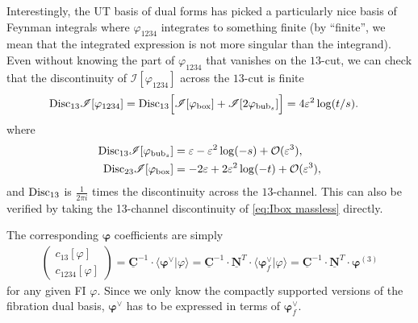 \documentclass[11pt]{article}
\newcommand{\la}{\langle}
\newcommand{\ra}{\rangle}
\newcommand{\vphi}{\varphi}
\newcommand{\vep}{\varepsilon}
\newcommand{\disc}{{\rm Disc}}
\newcommand{\bs}[1]{\boldsymbol{#1}}
\newcommand{\mat}[1]{\underline{\boldsymbol{#1}}}
\begin{document}
Interestingly, the UT basis of dual forms has picked a particularly nice basis of Feynman integrals where $\vphi_{1234}$ integrates to something finite
(by ``finite'', we mean that the integrated expression is not more singular than the integrand).
Even without knowing the part of $\vphi_{1234}$ that vanishes on the $13$-cut, we can check that the discontinuity of $\mathscr{I}[\vphi_{1234}]$ across the $13$-cut is finite
\begin{align}
	\disc_{13}\mathscr{I}[\vphi_{1234}]
	& = \disc_{13} \Big[ 
		\mathscr{I}[\vphi_{\text{box}}] 
		+ \mathscr{I}[2\vphi_{\text{bub}_s}] 
	\Big]
	= 4\vep^2 \log(t/s).
\end{align}
where 
\begin{align}
	\disc_{13}\mathscr{I}[\vphi_{\text{bub}_s}]
	& = \vep - \vep^2 \log(-s) + \mathcal{O}(\vep^3),
	\\
	\disc_{23}\mathscr{I}[\vphi_{\text{box}}]
	& = -2\vep + 2\vep^2 \log(-t) + \mathcal{O}(\vep^3),
\end{align}
and $\disc_{13}$ is $\frac{1}{2\pi i}$ times the discontinuity across the $13$-channel.
This can also be verified by taking the 13-channel discontinuity of \eqref{eq:Ibox massless} directly. 



The corresponding $\bs{\vphi}$ coefficients are simply 
\begin{align}
	\begin{pmatrix} c_{13}[\vphi] \\ c_{1234}[\vphi] \end{pmatrix}
	= \mat{C}^{-1} \cdot \la \bs{\vphi}^\vee \vert \vphi \rangle
	= \mat{C}^{-1} \cdot \mat{N}^T \cdot \la \bs{\vphi}^\vee_f \vert \vphi \ra
	= \mat{C}^{-1} \cdot \mat{N}^T \cdot \bs{\vphi}^{(3)}
\end{align}
for any given FI $\vphi$. Since we only know the compactly supported versions of the fibration dual basis, $\bs{\vphi}^\vee$ has to be expressed in terms of $\bs{\vphi}^\vee_f$. 
\end{document}
